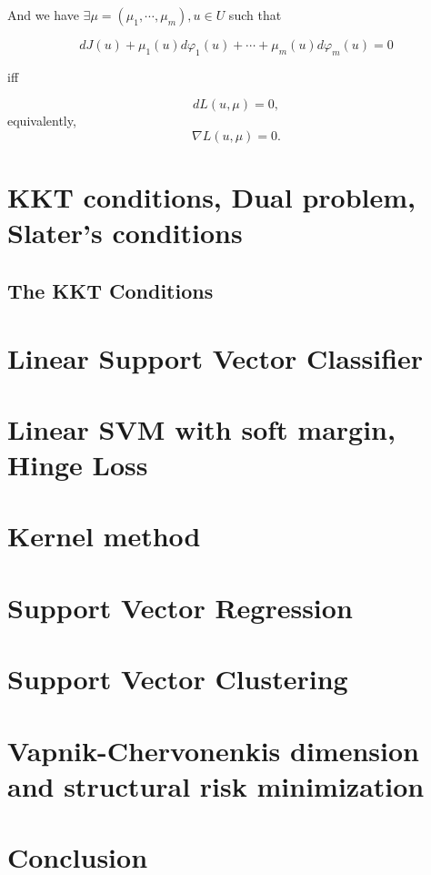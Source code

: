 \documentclass[a4paper,12pt]{report}
\begin{document}
And we have $\exists \mu=(\mu_1,\cdots,\mu_m), u\in U$ such that

\[
    dJ(u)+\mu_1(u)d\varphi_1(u)+\cdots+\mu_m(u)d\varphi_m(u)=0
\]

iff

\[
    dL(u,\mu)=0,
\]
equivalently,
\[
    \nabla L(u,\mu)=0.
\]


\chapter{KKT conditions, Dual problem, Slater's conditions}
\section{The KKT Conditions}



\chapter{Linear Support Vector Classifier}
\chapter{Linear SVM with soft margin, Hinge Loss}
\chapter{Kernel method}
\chapter{Support Vector Regression}
\chapter{Support Vector Clustering}
\chapter{Vapnik-Chervonenkis dimension and structural risk minimization}
\chapter{Conclusion}

{}

\end{document}
